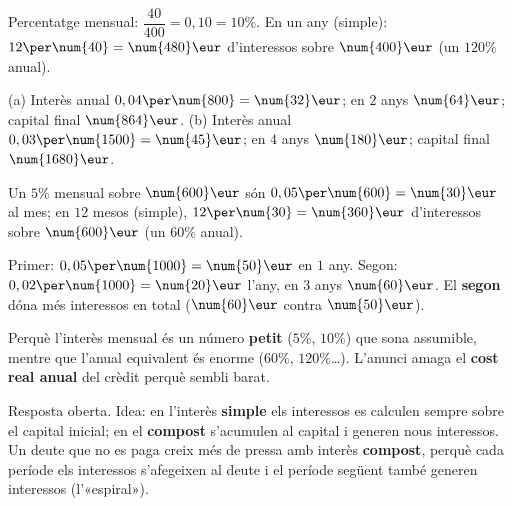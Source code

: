 \begin{solucions}
\begin{sollist}
  \item Percentatge mensual: $\dfrac{\num{40}}{\num{400}}=0,10=10\%$. En un any
        (simple): $12\per\num{40}=\num{480}\eur$ d'interessos sobre $\num{400}\eur$
        (un $120\%$ anual).
  \item (a) Interès anual $0,04\per\num{800}=\num{32}\eur$; en $2$ anys
        $\num{64}\eur$; capital final $\num{864}\eur$. \quad
        (b) Interès anual $0,03\per\num{1500}=\num{45}\eur$; en $4$ anys
        $\num{180}\eur$; capital final $\num{1680}\eur$.
  \item Un $5\%$ mensual sobre $\num{600}\eur$ són $0,05\per\num{600}=\num{30}\eur$ al
        mes; en $12$ mesos (simple), $12\per\num{30}=\num{360}\eur$ d'interessos sobre
        $\num{600}\eur$ (un $60\%$ anual).
  \item Primer: $0,05\per\num{1000}=\num{50}\eur$ en $1$ any. Segon:
        $0,02\per\num{1000}=\num{20}\eur$ l'any, en $3$ anys $\num{60}\eur$. El
        \textbf{segon} dóna més interessos en total ($\num{60}\eur$ contra $\num{50}\eur$).
  \item Perquè l'interès mensual és un número \textbf{petit} ($5\%$, $10\%$) que sona
        assumible, mentre que l'anual equivalent és enorme ($60\%$, $120\%$\dots).
        L'anunci amaga el \textbf{cost real anual} del crèdit perquè sembli barat.
  \item Resposta oberta. Idea: en l'interès \textbf{simple} els interessos es calculen
        sempre sobre el capital inicial; en el \textbf{compost} s'acumulen al capital i
        generen nous interessos. Un deute que no es paga creix més de pressa amb interès
        \textbf{compost}, perquè cada període els interessos s'afegeixen al deute i el
        període següent també generen interessos (l'«espiral»).
\end{sollist}
\end{solucions}
